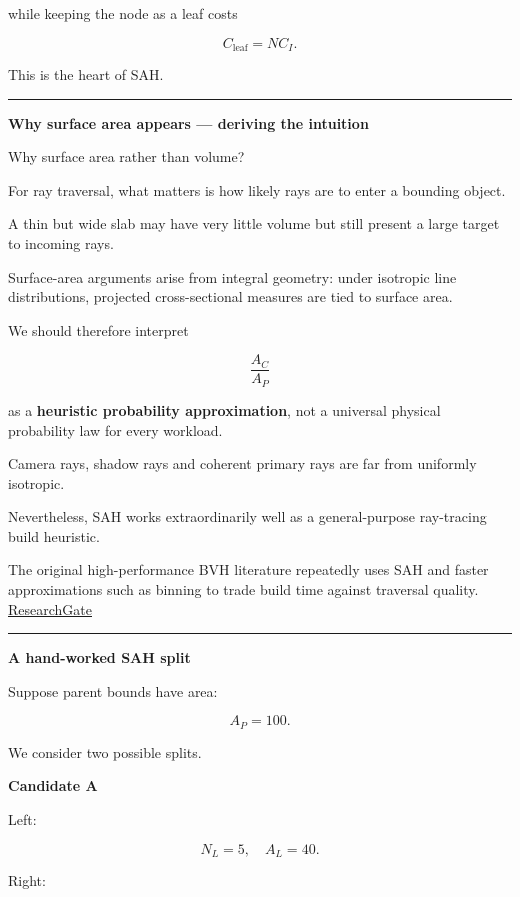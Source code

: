 while keeping the node as a leaf costs

\[
\boxed{
C_{\text{leaf}}=NC_I.
}
\]

This is the heart of SAH.

\begin{center}\rule{0.5\linewidth}{0.5pt}\end{center}

\textbf{Why surface area appears --- deriving the intuition}

Why surface area rather than volume?

For ray traversal, what matters is how likely rays are to enter a bounding object.

A thin but wide slab may have very little volume but still present a large target to incoming rays.

Surface-area arguments arise from integral geometry: under isotropic line distributions, projected cross-sectional measures are tied to surface area.

We should therefore interpret

\[
\frac{A_C}{A_P}
\]

as a \textbf{heuristic probability approximation}, not a universal physical probability law for every workload.

Camera rays, shadow rays and coherent primary rays are far from uniformly isotropic.

Nevertheless, SAH works extraordinarily well as a general-purpose ray-tracing build heuristic.

The original high-performance BVH literature repeatedly uses SAH and faster approximations such as binning to trade build time against traversal quality. \href{https://www.researchgate.net/publication/4278645_On_Fast_Construction_of_SAH_based_Bounding_Volume_Hierarchies?utm_source=chatgpt.com}{ResearchGate}

\begin{center}\rule{0.5\linewidth}{0.5pt}\end{center}

\textbf{A hand-worked SAH split}

Suppose parent bounds have area:

\[
A_P=100.
\]

We consider two possible splits.

\textbf{Candidate A}

Left:

\[
N_L=5,\quad A_L=40.
\]

Right:

